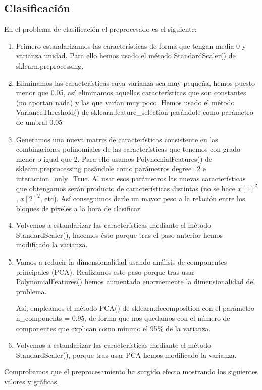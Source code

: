 \documentclass[12pt]{article}
\begin{document}
\subsection{Clasificación}

En el problema de clasificación el preprocesado es el siguiente:

\begin{enumerate}
	\item Primero estandarizamos las características de forma que tengan media 0 y varianza unidad. Para ello hemos usado el método StandardScaler() de sklearn.preprocessing.
	\item Eliminamos las características cuya varianza sea muy pequeña, hemos puesto menor que 0.05, así eliminamos aquellas características que son constantes (no aportan nada) y las que varían muy poco. Hemos usado el método VarianceThreshold() de sklearn.feature\_selection pasándole como parámetro de umbral 0.05
	\item Generamos una nueva matriz de características consistente en las combinaciones polinomiales de las características que tenemos con grado menor o igual que 2. Para ello usamos PolynomialFeatures() de sklearn.preprocessing pasándole como parámetros degree=2 e interaction\_only=True. Al usar esos parámetros las nuevas características que obtengamos serán producto de características distintas (no se hace $x[1]^2$, $x[2]^2$, etc). Así conseguimos darle un mayor peso a la relación entre los bloques de píxeles a la hora de clasificar.
	\item Volvemos a estandarizar las características mediante el método StandardScaler(), hacemos ésto porque tras el paso anterior hemos modificado la varianza.
	\item Vamos a reducir la dimensionalidad usando análisis de componentes principales (PCA). Realizamos este paso porque tras usar PolynomialFeatures() hemos aumentado enormemente la dimensionalidad del problema. 
	
	Así, empleamos el método PCA() de sklearn.decomposition con el parámetro n\_components = 0.95, de forma que nos quedamos con el número de componentes que explican como mínimo el 95\% de la varianza.
	\item Volvemos a estandarizar las características mediante el método StandardScaler(), porque tras usar PCA hemos modificado la varianza.
\end{enumerate}

Comprobamos que el preprocesamiento ha surgido efecto mostrando los siguientes valores y gráficas.
\end{document}
